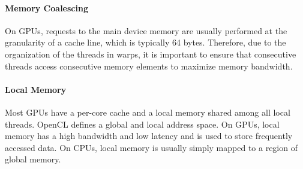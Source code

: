\paragraph{Memory Coalescing}
On GPUs, requests to the main device memory are usually performed at the granularity of a cache line, which is typically 64 bytes.
Therefore, due to the organization of the threads in warps, it is important to ensure that consecutive threads access consecutive memory elements to maximize memory bandwidth.

\paragraph{Local Memory}
Most GPUs have a per-core cache and a local memory shared among all local threads.
OpenCL defines a global and local address space.
On GPUs, local memory has a high bandwidth and low latency and is used to store frequently accessed data.
On CPUs, local memory is usually simply mapped to a region of global memory.


